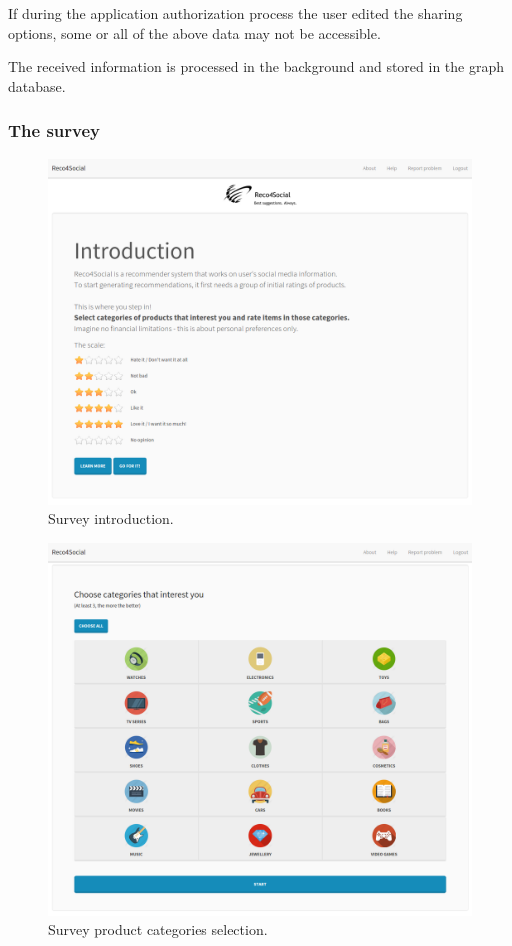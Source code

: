 \documentclass[12pt]{report}
\begin{document}
If during the application authorization process the user edited the sharing options, some or all of the above data may not be accessible.

The received information is processed in the background and stored in the graph database.

\subsubsection{The survey}
\begin{figure}[!t]
\centering
\includegraphics[width=\textwidth]{reco4_survey-intro-1.png} 
\caption[Survey introduction.]{Survey introduction.}
\label{fig.survey.intro-1}
\end{figure}

\begin{figure}[!t]
\centering
\includegraphics[width=\textwidth]{reco4_survey-intro-2.png} 
\caption[Survey product categories selection.]{Survey product categories selection.}
\label{fig.survey.intro-2}
\end{figure}
\end{document}
